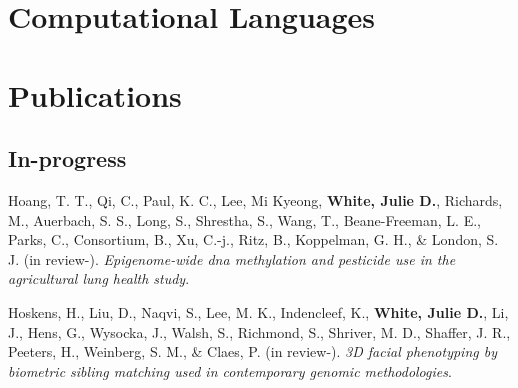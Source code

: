 \documentclass[11pt, a4paper]{awesome-cv}
\begin{document}
\begin{cventries}
    \vspace{-4.0mm}
    \vspace{-4.0mm}
    \vspace{-4.0mm}
    \vspace{-4.0mm}
    \vspace{-4.0mm}
    \vspace{-4.0mm}
    \vspace{-4.0mm}
\end{cventries}

\hypertarget{computational-languages}{%
\section{Computational Languages}\label{computational-languages}}

\hypertarget{publications}{%
\section{Publications}\label{publications}}

\hypertarget{in-progress}{%
\subsection{In-progress}\label{in-progress}}

\begingroup
\setlength{\parindent}{-0.5in}
\setlength{\leftskip}{0.5in}

\hypertarget{refs_inprogress}{}
\leavevmode\hypertarget{ref-Thanh_PesticideEWAS}{}%
Hoang, T. T., Qi, C., Paul, K. C., Lee, Mi Kyeong, \textbf{White, Julie
D.}, Richards, M., Auerbach, S. S., Long, S., Shrestha, S., Wang, T.,
Beane-Freeman, L. E., Parks, C., Consortium, B., Xu, C.-j., Ritz, B.,
Koppelman, G. H., \& London, S. J. (in review-). \emph{Epigenome-wide
dna methylation and pesticide use in the agricultural lung health
study}.

\leavevmode\hypertarget{ref-Hoskens_BiometricMatching}{}%
Hoskens, H., Liu, D., Naqvi, S., Lee, M. K., Indencleef, K.,
\textbf{White, Julie D.}, Li, J., Hens, G., Wysocka, J., Walsh, S.,
Richmond, S., Shriver, M. D., Shaffer, J. R., Peeters, H., Weinberg, S.
M., \& Claes, P. (in review-). \emph{3D facial phenotyping by biometric
sibling matching used in contemporary genomic methodologies}.
\end{document}
